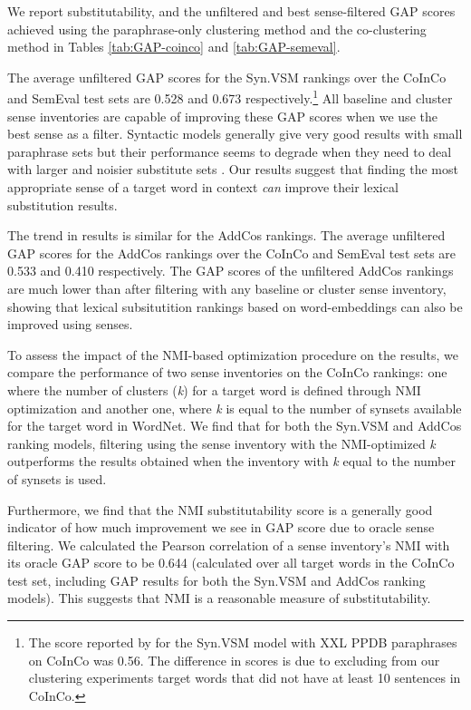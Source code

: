 \documentclass[11pt]{article}
\begin{document}
	We report substitutability, and the unfiltered and best sense-filtered GAP scores achieved using the paraphrase-only clustering method and the co-clustering method in Tables \ref{tab:GAP-coinco} and \ref{tab:GAP-semeval}. 
	
	The average unfiltered GAP scores for the Syn.VSM rankings over the CoInCo and SemEval test sets are 0.528 and 0.673 respectively.\footnote{The score reported by  for the Syn.VSM model with  XXL PPDB paraphrases on CoInCo was 0.56. The difference in scores is due to excluding from our clustering experiments target words that did not have at least 10 sentences in CoInCo.}  All baseline and cluster sense inventories are capable of improving these GAP scores when we use the best sense as a filter. Syntactic models generally give very good results with small paraphrase sets \cite{kremer-EtAl:2014:EACL} but their performance seems to degrade when they need to deal with larger and noisier substitute sets \cite{apidianaki:2016:EMNLP2016}. Our results suggest that finding the most appropriate sense of a target word in context \textit{can} improve their lexical substitution results. 
	
	The trend in results is similar for the AddCos rankings. The average unfiltered GAP scores for the AddCos rankings over the CoInCo and SemEval test sets are 0.533 and 0.410 respectively. The GAP scores of the unfiltered AddCos rankings are much lower than after filtering with any baseline or cluster sense inventory, showing that lexical subsitutition rankings based on word-embeddings can also be improved using senses. 
	
	To assess the impact of the NMI-based optimization procedure on the results, we compare the performance of two sense inventories on the CoInCo rankings: one where the number of clusters (\textit{k}) for a target word is defined through NMI optimization  and another one, where \textit{k} is equal to the number of synsets available for the target word in WordNet. We find that for both the Syn.VSM and AddCos ranking models, filtering using the sense inventory with the NMI-optimized \textit{k} outperforms the results obtained when the inventory with \textit{k} equal to the number of synsets is used. 
	
	Furthermore, we find that the NMI substitutability score is a generally good indicator of how much improvement we see in GAP score due to oracle sense filtering. We calculated the Pearson correlation of a sense inventory's NMI with its oracle GAP score to be 0.644 (calculated over all target words in the CoInCo test set, including GAP results for both the Syn.VSM and AddCos ranking models). This suggests that NMI is a reasonable measure of substitutability. 
	
\end{document}
